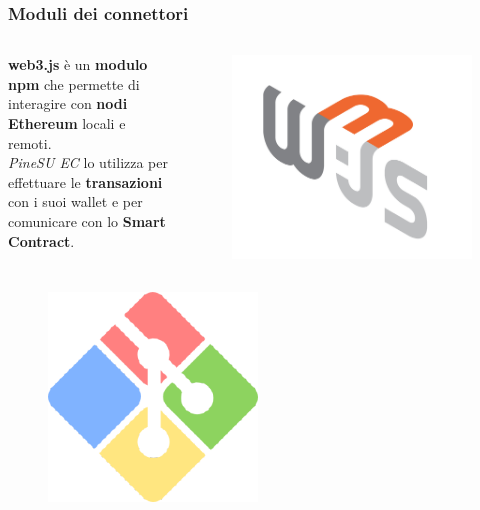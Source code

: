 \documentclass{beamer}
\begin{document}
\begin{frame}
	\frametitle{Moduli dei connettori}
	\begin{columns}
		\textbf{web3.js} è un \textbf{modulo npm} che permette di
		interagire con \textbf{nodi Ethereum} locali e remoti.\\
		\smallskip
		\emph{PineSU EC} lo utilizza per effettuare le \textbf{transazioni} con i
		suoi wallet e per comunicare con lo \textbf{Smart Contract}. \\
		\centering
		\begin{figure}
			\includegraphics[width=\textwidth]{figures/web3.jpg}
		\end{figure} 
	\end{columns}
	\medskip
	\begin{columns}
		\column{0.3\textwidth}
		\centering
		\begin{figure}
			\includegraphics[width=0.75\textwidth]{figures/gitfw.png}

\end{figure}
\end{columns}
\end{frame}
\end{document}
